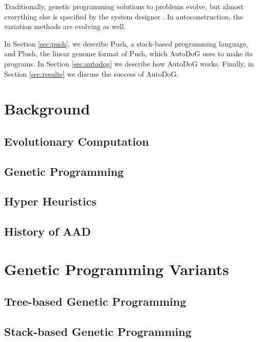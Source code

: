\documentclass{sig-alternate}
\begin{document}
Traditionally, genetic programming solutions to problems evolve, but almost everything else is specified by the system designer \cite{spector:2016}. In autoconstruction, the variation methods are evolving as well.

In Section \ref{sec:push}, we describe Push, a stack-based programming language, and Plush, the linear genome format of Push, which AutoDoG uses to make its programs. In Section \ref{sec:autodog} we describe how AutoDoG works. Finally, in Section \ref{sec:results} we discuss the success of AutoDoG.

\section{Background}
\label{sec:background}

\subsection{Evolutionary Computation}
\label{sec:evocomp}

\subsection{Genetic Programming}
\label{sec:GP}

\subsection{Hyper Heuristics}
\label{sec:HH}

\subsection{History of AAD}
\label{sec:history}

\section{Genetic Programming Variants}
\label{sec:gpvariants}

\subsection{Tree-based Genetic Programming}
\label{sec:tgp}

\subsection{Stack-based Genetic Programming}
\label{sec:sgp}
\end{document}
